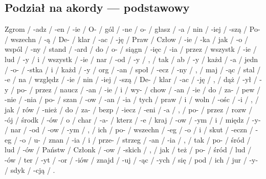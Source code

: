 \documentclass[12p, oneside]{book}
\begin{document}
\subsection{Podział na akordy --- podstawowy}
Zgrom  /  -adz / -en / -ie / O- / gól / -ne / o- / głasz / -a / nin / -iej / -szą / Po- / wszechn / -ą / De- / klar / -ac / -ję / Praw / Człow / -ie / -ka / jak / -o / wspól / -ny / stand / -ard / do / o- / siągn / -ięc / -ia / przez / wszystk / -ie / lud / -y / i / wszystk / -ie / nar / -od / -y / , / tak / ab / -y / każd / -a / jedn / -o- / -stka / i / każd / -y / org / -an / społ / -ecz / -ny / , / maj / -ąc / stal / -e / na / względz / -ie / nin / -iej / -szą / De- / klar / -ac / -ję / , / dąż / -ył / -y / po- / przez / naucz / -an / -ie / i / wy- / chow / -an / -ie / do / za- / pew / -nie / -nia / po- / szan / -ow / -an / -ia / tych / praw / i / woln / -ośc / -i / , / jak / rów / -nież / do / za- / bezp / -iecz / -eni / -a / , / po- / przez / rozw / -ój / środk / -ów / o / char / -a- / kterz / -e / kraj / -ow / -ym / i / międz / -y- / nar / -od / -ow / -ym / , / ich / po- / wszechn / -eg / -o / i / skut / -eczn / -eg / -o / u- / znan / -ia / i / prze- / strzeg / -an / -ia / , / tak / po- / śród / lud / -ów / Państw / Członk / -ow / -skich / , / jak / też / po- / śród / lud / -ów / ter / -yt / -or / -iów / znajd / -uj / -ąc / -ych / się / pod / ich / jur / -y- / sdyk / -cją / . 
\end{document}
